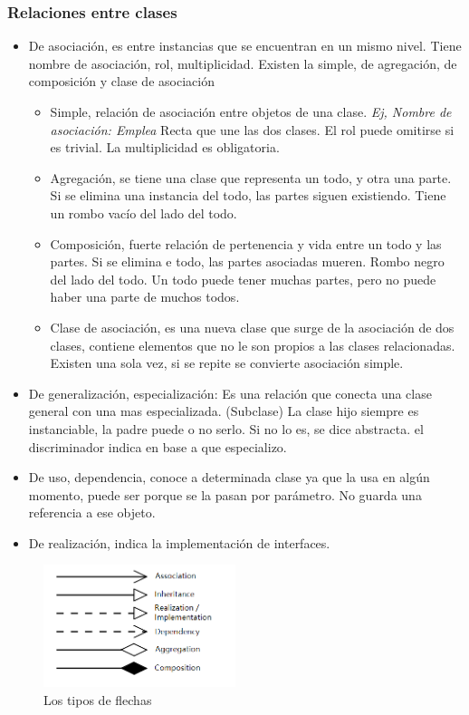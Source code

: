 \documentclass[titlepage,a4paper]{article}
\begin{document}
\subsubsection*{Relaciones entre clases}
\begin{itemize}
    \item De asociación, es entre instancias que se encuentran en un mismo nivel. Tiene nombre de asociación, rol, multiplicidad. Existen la simple, de agregación, de composición y clase de asociación
    
    \begin{itemize}
        \item Simple, relación de asociación entre objetos de una clase. \textit{Ej, Nombre de asociación: Emplea} Recta que une las dos clases. El rol puede omitirse si es trivial. La multiplicidad es obligatoria.
        \item Agregación, se tiene una clase que representa un todo, y otra una parte. Si se elimina una instancia del todo, las partes siguen existiendo. Tiene un rombo vacío del lado del todo.
        \item Composición, fuerte relación de pertenencia y vida entre un todo y las partes. Si se elimina e todo, las partes asociadas mueren. Rombo negro del lado del todo. Un todo puede tener muchas partes, pero no puede haber una parte de muchos todos.
        \item Clase de asociación, es una nueva clase que surge de la asociación de dos clases, contiene elementos que no le son propios a las clases relacionadas. Existen una sola vez, si se repite se convierte asociación simple.
    \end{itemize}
    
    \item De generalización, especialización: Es una relación que conecta una clase general con una mas especializada. (Subclase) La clase hijo siempre es instanciable, la padre puede o no serlo. Si no lo es, se dice abstracta. el discriminador indica en base a que especializo.
    
    \item De uso, dependencia, conoce a determinada clase ya que la usa en algún momento, puede ser porque se la pasan por parámetro. No guarda una referencia a ese objeto.
    \item De realización, indica la implementación de interfaces.
\end{itemize}

\begin{figure}[!htb]
    \centering
    \includegraphics[width=0.5\textwidth]{Imagenes/ClassDiagramArrowTypes.png}
    \caption{Los tipos de flechas}
\end{figure}
\end{document}
